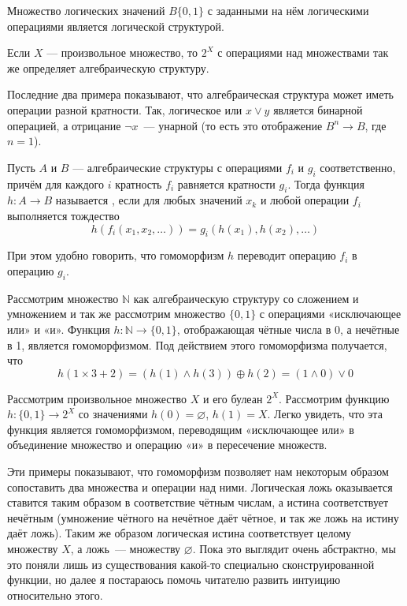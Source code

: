 \begin{example}
	Множество логических значений $B\{0, 1\}$ с заданными на нём логическими операциями является логической структурой.
\end{example}

\begin{example}
	Если $X$ — произвольное множество, то $2^X$ с операциями над множествами так же определяет алгебраическую структуру.
\end{example}

Последние два примера показывают, что алгебраическая структура может иметь операции разной кратности. Так, логическое или $x\lor y$ является бинарной операцией, а отрицание $\neg x$~— унарной (то есть это отображение $B^n\to B$, где $n=1$).

\begin{definition}
	Пусть $A$ и $B$ — алгебраические структуры с операциями $f_i$ и $g_i$ соответственно, причём для каждого $i$ кратность $f_i$ равняется кратности $g_i$. Тогда функция $h:A\to B$ называется , если для любых значений $x_k$ и любой операции $f_i$ выполняется тождество
\[
h(f_i(x_1, x_2, \ldots)) = g_i(h(x_1), h(x_2), \ldots)
\]

При этом удобно говорить, что гомоморфизм $h$ переводит операцию $f_i$ в операцию $g_i$.
\end{definition}

\begin{example}\label{ex:alg_epi}
	Рассмотрим множество $\mathbb{N}$ как алгебраическую структуру со сложением и умножением и так же рассмотрим множество $\{0, 1\}$ с операциями «исключающее или» и «и». Функция $h:\mathbb{N}\to\{0, 1\}$, отображающая чётные числа в 0, а нечётные в 1, является гомоморфизмом. Под действием этого гомоморфизма получается, что
\[
h(1\times 3 + 2) = (h(1)\land h(3)) \oplus h(2) = (1\land 0) \lor 0
\]
\end{example}


\begin{example}\label{ex:alg_mono}
	Рассмотрим произвольное множество $X$ и его булеан $2^X$. Рассмотрим функцию $h:\{0, 1\}\to 2^X$ со значениями $h(0)=\varnothing$, $h(1)=X$. Легко увидеть, что эта функция является гомоморфизмом, переводящим «исключающее или» в объединение множество и операцию «и» в пересечение множеств.
\end{example}

Эти примеры показывают, что гомоморфизм позволяет нам некоторым образом сопоставить два множества и операции над ними. Логическая ложь оказывается ставится таким образом в соответствие чётным числам, а истина соответствует нечётным (умножение чётного на нечётное даёт чётное, и так же ложь на истину даёт ложь). Таким же образом логическая истина соответствует целому множеству $X$, а ложь~— множеству $\varnothing$. Пока это выглядит очень абстрактно, мы это поняли лишь из существования какой-то специально сконструированной функции, но далее я постараюсь помочь читателю развить интуицию относительно этого.

